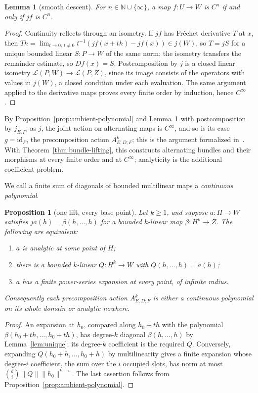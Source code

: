 \documentclass[11pt]{amsart}
\newtheorem{lemma}[theorem]{Lemma}
\newtheorem{proposition}[theorem]{Proposition}
\theoremstyle{definition}
\theoremstyle{remark}
\numberwithin{equation}{section}
\newcommand{\cL}{\mathcal L}
\newcommand{\id}{\mathrm{id}}
\newcommand{\norm}[1]{\lVert #1\rVert}
\theoremstyle{plain}
\theoremstyle{definition}
\theoremstyle{plain}
\begin{document}
\begin{lemma}[smooth descent]\label{lem:closed-smooth}
For $n\in\mathbb N\cup\{\infty\}$, a map $f\colon U\to W$ is $C^n$ if and only if $jf$ is $C^n$.
\end{lemma}
\begin{proof}
Continuity reflects through an isometry. If $jf$ has Fr\'echet derivative $T$ at $x$, then $Th=\lim_{t\to0,\,t\ne0}t^{-1}(jf(x+th)-jf(x))\in j(W)$, so $T=jS$ for a unique bounded linear $S\colon P\to W$ of the same norm; the isometry transfers the remainder estimate, so $Df(x)=S$. Postcomposition by $j$ is a closed linear isometry $\cL(P,W)\to\cL(P,Z)$, since its image consists of the operators with values in $j(W)$, a closed condition under each evaluation. The same argument applied to the derivative maps proves every finite order by induction, hence $C^\infty$.
\end{proof}

By Proposition~\ref{prop:ambient-polynomial} and Lemma~\ref{lem:closed-smooth} with postcomposition by $j_{E,F'}$ as $j$, the joint action on alternating maps is $C^\infty$, and so is its case $g=\id_F$, the precomposition action $A^k_{E,D;F}$; this is the argument formalized in~\cite{PR}. With Theorem~\ref{thm:bundle-lifting}, this constructs alternating bundles and their morphisms at every finite order and at $C^\infty$; analyticity is the additional coefficient problem.

We call a finite sum of diagonals of bounded multilinear maps a \emph{continuous polynomial}.
\begin{proposition}[one lift, every base point]\label{prop:homogeneous-lift}
Let $k\ge1$, and suppose $a\colon H\to W$ satisfies
$ja(h)=\beta(h,\ldots,h)$ for a bounded $k$-linear map $\beta\colon H^k\to Z$. The following are equivalent:
\begin{enumerate}
\item $a$ is analytic at some point of $H$;
\item there is a bounded $k$-linear $Q\colon H^k\to W$ with $Q(h,\ldots,h)=a(h)$;
\item $a$ has a finite power-series expansion at every point, of infinite radius.
\end{enumerate}
Consequently each precomposition action $A^k_{E,D;F}$ is either a continuous polynomial on its whole domain or analytic nowhere.
\end{proposition}
\begin{proof}
An expansion at $h_0$, compared along $h_0+th$ with the polynomial $\beta(h_0+th,\ldots,h_0+th)$, has degree-$k$ diagonal $\beta(h,\ldots,h)$ by Lemma~\ref{lem:unique}; its degree-$k$ coefficient is the required $Q$. Conversely, expanding $Q(h_0+h,\ldots,h_0+h)$ by multilinearity gives a finite expansion whose degree-$i$ coefficient, the sum over the $i$ occupied slots, has norm at most $\binom ki\norm Q\norm{h_0}^{k-i}$. The last assertion follows from Proposition~\ref{prop:ambient-polynomial}.
\end{proof}
\end{document}
